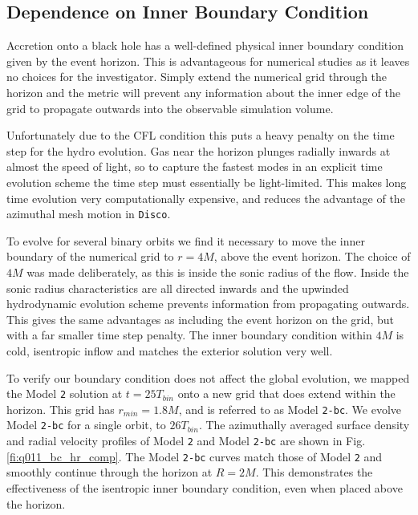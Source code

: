 \documentclass{emulateapj}
\newcommand{\Disco}{{\texttt{Disco}}}
\newcommand{\model}[1]{{Model \texttt{#1}}}
\begin{document}
\begin{figure*}
	\caption{\label{fi:spec} Spectra of \model{1} (blue circles), \model{2} (orange crosses), and \model{3} (green triangles) at $t = 28 T_{bin}$, obtained by integrating over the ray-traced intensity (e.g. in Fig \ref{fi:im}).  Solid lines are Novikov-Thorne spectra with $\dot{M}$ of the inner boundary averaged over $20 T_{bin}$ to $29 T_{bin}$ for each model.  Only the $R<40M$ region is included in the integration, to remove the effect of truncation at the outer disk edge.  The inclination angle $i=60^\circ$ and the distance $D=1kpc$.}
\end{figure*}

\subsection{Dependence on Inner Boundary Condition}
\label{subsec:bc}

Accretion onto a black hole has a well-defined physical inner boundary condition given by the event horizon.  This is advantageous for numerical studies as it leaves no choices for the investigator. Simply extend the numerical grid through the horizon and the metric will prevent any information about the inner edge of the grid to propagate outwards into the observable simulation volume.  

Unfortunately due to the CFL condition this puts a heavy penalty on the time step for the hydro evolution.  Gas near the horizon plunges radially inwards at almost the speed of light, so to capture the fastest modes in an explicit time evolution scheme the time step must essentially be light-limited. This makes long time evolution very computationally expensive, and reduces the advantage of the azimuthal mesh motion in \Disco{}.

To evolve for several binary orbits we find it necessary to move the inner boundary of the numerical grid to $r=4M$, above the event horizon.  The choice of $4M$ was made deliberately, as this is inside the sonic radius of the flow. Inside the sonic radius characteristics are all directed inwards and the upwinded hydrodynamic evolution scheme prevents information from propagating outwards.  This gives the same advantages as including the event horizon on the grid, but with a far smaller time step penalty.  The inner boundary condition within $4M$ is cold, isentropic inflow and matches the exterior solution very well.

To verify our boundary condition does not affect the global evolution, we mapped the \model{2} solution at $t=25 T_{bin}$ onto a new grid that does extend within the horizon.  This grid has $r_{min} = 1.8M$, and is referred to as \model{2-bc}.  We evolve \model{2-bc} for a single orbit, to $26T_{bin}$.  The azimuthally averaged surface density and radial velocity profiles of \model{2} and \model{2-bc} are shown in Fig. \ref{fi:q011_bc_hr_comp}.  The \model{2-bc} curves match those of \model{2} and smoothly continue through the horizon at $R=2M$.  This demonstrates the effectiveness of the isentropic inner boundary condition, even when placed above the horizon.
\end{document}
